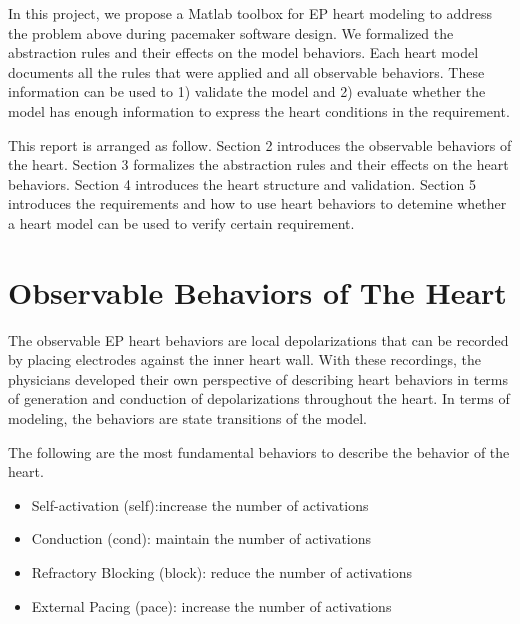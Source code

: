 \documentclass{llncs}
\newcommand{\Hao}[1]{$\clubsuit$\footnote{HAO: #1}}
\begin{document}
In this project, we propose a Matlab toolbox for EP heart modeling to address the problem above during pacemaker software design. We formalized the abstraction rules and their effects on the model behaviors. Each heart model documents all the rules that were applied and all observable behaviors. These information can be used to 1) validate the model and 2) evaluate whether the model has enough information to express the heart conditions in the requirement. 

This report is arranged as follow. Section 2 introduces the observable behaviors of the heart. Section 3 formalizes the abstraction rules and their effects on the heart behaviors. Section 4 introduces the heart structure and validation. Section 5 introduces the requirements and how to use heart behaviors to detemine whether a heart model can be used to verify certain requirement.

\section{Observable Behaviors of The Heart}
The observable EP heart behaviors are local depolarizations that can be recorded by placing electrodes against the inner heart wall. With these recordings, the physicians developed their own perspective of describing heart behaviors in terms of generation and conduction of depolarizations throughout the heart. In terms of modeling, the behaviors are state transitions of the model.%

The following are the most fundamental behaviors to describe the behavior of the heart.
\begin{itemize}
	\item Self-activation (self):increase the number of activations
    \item Conduction (cond): maintain the number of activations %
    \item Refractory Blocking (block): reduce the number of activations
    \item External Pacing (pace): increase the number of activations

\end{itemize}
\end{document}
